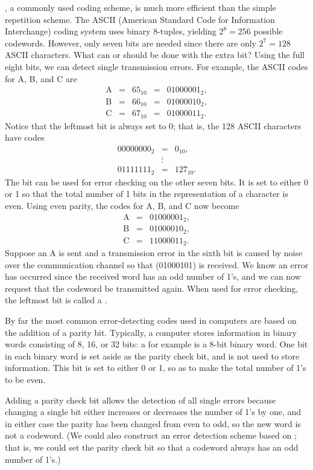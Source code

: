 \begin{example}{}
, a  commonly  used coding scheme, is much
more efficient than the simple repetition scheme. The ASCII (American
Standard Code for Information Interchange) coding system uses binary
8-tuples, yielding $2^{8} = 256$ possible codewords. However, only seven
bits are needed since there are only $2^7 = 128$ ASCII characters.
What can or should be done with the extra bit? Using the full eight
bits, we can detect single transmission errors. For example, the ASCII
codes for A, B, and C are 
\[
\begin{array}{rcccl}
\mbox{A} & = & 65_{10} & = & 01000001_{2}, \\
\mbox{B} & = & 66_{10} & = & 01000010_{2}, \\
\mbox{C} & = & 67_{10} & = & 01000011_{2}.
\end{array}
\]
Notice that the leftmost bit is always set to 0; that is, the 128 ASCII
characters have codes 
\begin{eqnarray*}
00000000_{2} & = & 0_{10}, \\
& \vdots & \\
01111111_{2} & = & 127_{10}.
\end{eqnarray*}
The bit can be used for error checking on the other seven bits. It is
set to either 0 or 1 so that the total number of 1 bits in the
representation of a character is even. Using even parity, the codes
for A, B, and C now become 
\begin{eqnarray*}
\mbox{A} & = & 01000001_{2}, \\
\mbox{B} & = & 01000010_{2}, \\
\mbox{C} & = & 11000011_{2}.
\end{eqnarray*}
Suppose an A is sent and a transmission error in the sixth
bit is caused by noise over the communication channel so that 
(01000101) is received. We know an error has occurred since the
received word has an odd number of 1's, and we can now request that the
codeword be transmitted again. When used for error checking, the
leftmost bit is called a .  
  
By far the most common error-detecting
codes used in computers are based on the addition of a parity bit.
Typically, a computer stores information in binary words consisting of 8, 16, or 32 bits:
a   for example is a 8-bit binary word. One bit in each binary 
word is set aside as the parity check bit, and is not used to store
information. This bit is set to either 0 or 1, so as to make the total number of 1's to be even. 
 
Adding a parity check bit allows the detection of all single errors
because changing a single bit either increases or decreases the number
of 1's by one, and in either case the parity has been changed from
even to odd, so the new word is not a codeword. (We could also
construct an error detection scheme based on ; that
is, we could set the parity check bit so that a codeword always has an
odd number of 1's.)  
\end{example} 

